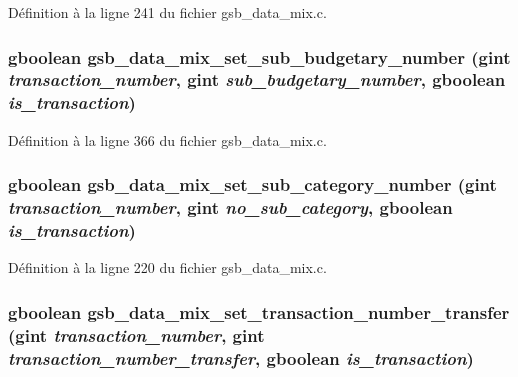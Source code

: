 Définition à la ligne 241 du fichier gsb\_\-data\_\-mix.c.

\subsubsection[{gsb\_\-data\_\-mix\_\-set\_\-sub\_\-budgetary\_\-number}]{\setlength{\rightskip}{0pt plus 5cm}gboolean gsb\_\-data\_\-mix\_\-set\_\-sub\_\-budgetary\_\-number (gint {\em transaction\_\-number}, \/  gint {\em sub\_\-budgetary\_\-number}, \/  gboolean {\em is\_\-transaction})}\label{gsb__data__mix_8c_a6166a76f93e77b6bafd43afb1ed616ad}


Définition à la ligne 366 du fichier gsb\_\-data\_\-mix.c.

\subsubsection[{gsb\_\-data\_\-mix\_\-set\_\-sub\_\-category\_\-number}]{\setlength{\rightskip}{0pt plus 5cm}gboolean gsb\_\-data\_\-mix\_\-set\_\-sub\_\-category\_\-number (gint {\em transaction\_\-number}, \/  gint {\em no\_\-sub\_\-category}, \/  gboolean {\em is\_\-transaction})}\label{gsb__data__mix_8c_a409ba94a9f91539a976c4181048f2e32}


Définition à la ligne 220 du fichier gsb\_\-data\_\-mix.c.

\subsubsection[{gsb\_\-data\_\-mix\_\-set\_\-transaction\_\-number\_\-transfer}]{\setlength{\rightskip}{0pt plus 5cm}gboolean gsb\_\-data\_\-mix\_\-set\_\-transaction\_\-number\_\-transfer (gint {\em transaction\_\-number}, \/  gint {\em transaction\_\-number\_\-transfer}, \/  gboolean {\em is\_\-transaction})}\label{gsb__data__mix_8c_a37d924fdac56d828fe15f795bdb48229}


